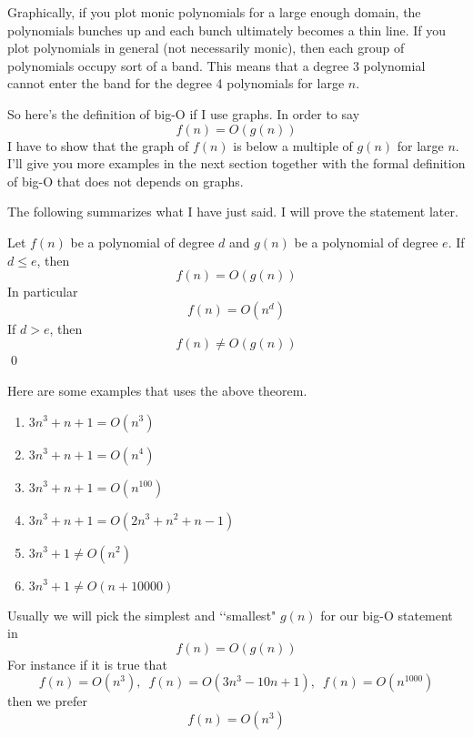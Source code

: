 Graphically, if you plot monic polynomials for a large enough domain,
the polynomials bunches up and each bunch ultimately becomes a thin line.
If you plot polynomials in general (not necessarily monic), then
each group of polynomials occupy sort of a band.
This means that a degree 3 polynomial cannot enter the band for the degree 4 
polynomials for large $n$.

So here's the definition of big-O if I use graphs.
In order to say
\[
f(n) = O(g(n))
\]
I have to show that the graph of $f(n)$ is below a multiple of $g(n)$
for large $n$.
I'll give you more examples in the next section together with
the formal definition of big-O that does not depends on graphs.

The following summarizes what I have just said.
I will prove the statement later.

\begin{thm}
Let $f(n)$ be a polynomial of degree $d$ and $g(n)$ be a polynomial
of degree $e$.
If $d \leq e$, then
\[
f(n) = O(g(n))
\]
In particular
\[
f(n) = O(n^d)
\]
If $d > e$, then
\[
f(n) \neq O(g(n))
\]
\qed
\end{thm}

\begin{eg}
  Here are some examples that uses the above theorem.
  \begin{enumerate}[nosep,label=(\alph*)]
  \item $3n^3 + n + 1 = O(n^3)$
  \item $3n^3 + n + 1 = O(n^4)$  
  \item $3n^3 + n + 1 = O(n^{100})$
  \item $3n^3 + n + 1 = O(2n^3 + n^2 + n - 1)$
  \item $3n^3 + 1 \neq O(n^2)$
  \item $3n^3 + 1 \neq O(n + 10000)$
  \end{enumerate}
\end{eg}

Usually we will pick the simplest and \lq\lq smallest" $g(n)$
for our big-O statement in
\[
f(n) = O(g(n))
\]
For instance if it is true that
\[
f(n) = O(n^3), \,\,\,
f(n) = O(3n^3 - 10n + 1), \,\,\,
f(n) = O(n^{1000})
\]
then we prefer
\[
f(n) = O(n^3)
\]

\newpage
